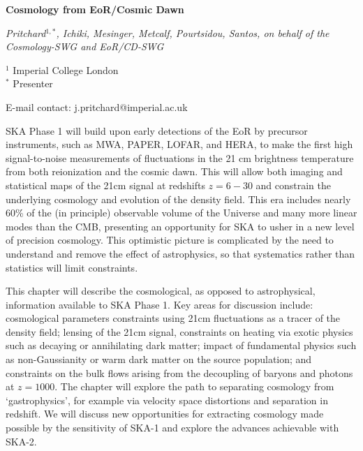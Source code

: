 \documentclass[12pt,a4paper]{article}
\begin{document}
\noindent
{\Large\bf
Cosmology from EoR/Cosmic Dawn
} %

\noindent
{\em 
Pritchard$^{1,*}$, Ichiki, Mesinger, Metcalf, Pourtsidou, Santos, on behalf of the Cosmology-SWG and EoR/CD-SWG} %

\noindent
$^1$ Imperial College London\\
$^*$ Presenter

\noindent
E-mail contact: j.pritchard@imperial.ac.uk

SKA Phase 1 will build upon early detections of the EoR by precursor instruments, such as MWA, PAPER, LOFAR, and HERA, to make the first high signal-to-noise measurements of fluctuations in the 21 cm brightness temperature from both reionization and the cosmic dawn. This will allow both imaging and statistical maps of the 21cm signal at redshifts $z=6-30$ and constrain the underlying cosmology and evolution of the density field. This era includes nearly 60\% of the (in principle) observable volume of the Universe and many more linear modes than the CMB, presenting an opportunity for SKA to usher in a new level of precision cosmology. This optimistic picture is complicated by the need to understand and remove the effect of astrophysics, so that systematics rather than statistics will limit constraints.

This chapter will describe the cosmological, as opposed to astrophysical, information available to SKA Phase 1. Key areas for discussion include: cosmological parameters constraints using 21cm fluctuations as a tracer of the density field; lensing of the 21cm signal, constraints on heating via exotic physics such as decaying or annihilating dark matter; impact of fundamental physics such as non-Gaussianity or warm dark matter on the source population; and constraints on the bulk flows arising from the decoupling of baryons and photons at $z=1000$. The chapter will explore the path to separating cosmology from `gastrophysics', for example via velocity space distortions and separation in redshift. We will discuss new opportunities for extracting cosmology made possible by the sensitivity of SKA-1 and explore the advances achievable with SKA-2.
\end{document}
